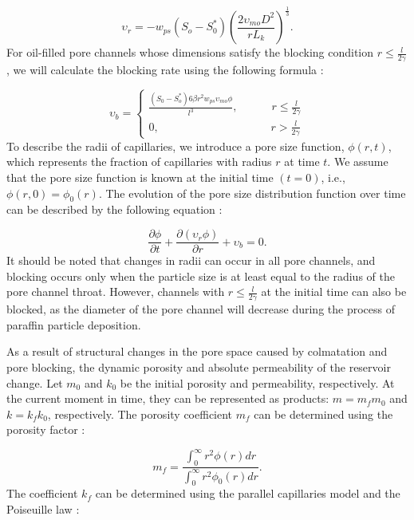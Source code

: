 \documentclass[
11pt,%
tightenlines,%
twoside,%
onecolumn,%
nofloats,%
nobibnotes,%
nofootinbib,%
superscriptaddress,%
noshowpacs,%
centertags]%
{revtex4-2}
\begin{document}
\begin{equation}\label{eq7}
\upsilon_r = -w_{ps} (S_o-S_{0}^{*}) \left ( \frac{2 \upsilon_{mo} D^2}{r L_k} \right )^{\frac{1}{3}}.
\end{equation}
For oil-filled pore channels whose dimensions satisfy the blocking condition $r \leq \frac{l}{2 \gamma}$, we will calculate the blocking rate using the following formula \cite{8}:

\begin{equation}\label{eq8}
\upsilon_b = \left\{\begin{matrix}
\frac{(S_0-S_{o}^{*}) 6 \beta r^2 w_{ps} \upsilon_{mo} \phi}{l^3}, \quad \qquad r \leq \frac{l}{2 \gamma}
 \\
 0, \qquad \qquad \qquad \qquad \qquad r > \frac{l}{2 \gamma}
\end{matrix}\right.
\end{equation}
To describe the radii of capillaries, we introduce a pore size function, $ \phi (r,t)$, which represents the fraction of capillaries with radius $r$ at time $t$. We assume that the pore size function is known at the initial time $(t = 0)$, i.e.,  $ \phi (r,0)= \phi_0 (r)$. The evolution of the pore size distribution function over time can be described by the following equation \cite{14}:

\begin{equation}\label{eq9}
\frac{\partial \phi}{\partial t} + \frac{\partial (\upsilon_r \phi)}{\partial r} + \upsilon_b = 0.
\end{equation}
It should be noted that changes in radii can occur in all pore channels, and blocking occurs only when the particle size is at least equal to the radius of the pore channel throat. However, channels with $r \leq \frac{l}{2 \gamma}$ at the initial time can also be blocked, as the diameter of the pore channel will decrease during the process of paraffin particle deposition.

	As a result of structural changes in the pore space caused by colmatation and pore blocking, the dynamic porosity and absolute permeability of the reservoir change. Let $m_0$ and $k_0$ be the initial porosity and permeability, respectively. At the current moment in time, they can be represented as products: $m=m_f m_0$ and $k=k_f k_0$, respectively. The porosity coefficient $m_f$ can be determined using the porosity factor \cite{8}:

\begin{equation}\label{eq10}
m_f = \frac
{ \int_{0}^{\infty} r^2 \phi (r) dr}
{ \int_{0}^{\infty} r^2 \phi_0 (r) dr}.
\end{equation}
The coefficient $k_f$ can be determined using the parallel capillaries model and the Poiseuille law \cite{8}:
\end{document}
